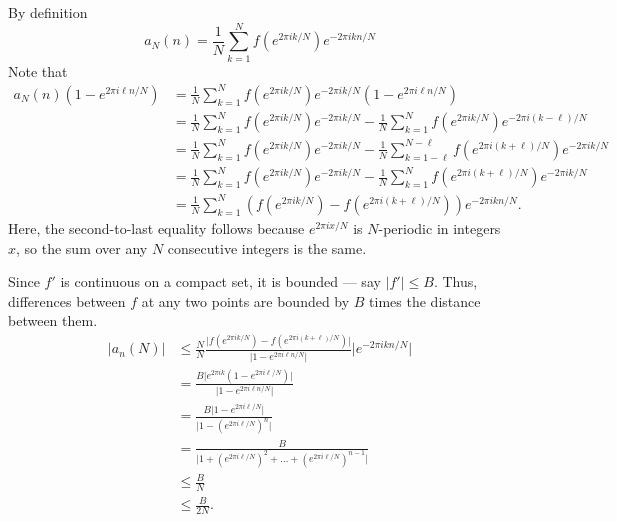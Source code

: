 \documentclass[12 pt, letterpaper]{hmcpset}
\begin{document}
\begin{solution}
	By definition
	\[
		a_{N}(n) = \frac{1}{N} \sum_{k = 1}^{N} f(e^{2 \pi i k / N}) e^{-2 \pi i k n / N}
	\]
	Note that
	\begin{align*}
		a_{N}(n) (1 - e^{2 \pi i \ell n / N}) & = \frac{1}{N} \sum_{k = 1}^{N} f(e^{2 \pi i k / N}) e^{- 2 \pi i k / N} (1 - e^{2 \pi i \ell n / N}) \\
						      & = \frac{1}{N} \sum_{k = 1}^{N} f(e^{2 \pi i k / N}) e^{-2 \pi i k / N} - \frac{1}{N} \sum_{k = 1}^{N} f(e^{2 \pi i k / N}) e^{- 2 \pi i (k - \ell) / N} \\
						      & = \frac{1}{N} \sum_{k = 1}^{N} f(e^{2 \pi i k / N}) e^{-2 \pi i k / N} - \frac{1}{N} \sum_{k = 1 - \ell}^{N - \ell} f(e^{2 \pi i (k + \ell) / N}) e^{- 2 \pi i k / N} \\
						      & = \frac{1}{N} \sum_{k = 1}^{N} f(e^{2 \pi i k / N}) e^{-2 \pi i k / N} - \frac{1}{N} \sum_{k = 1}^{N} f(e^{2 \pi i (k + \ell) / N}) e^{- 2 \pi i k / N} \\
						      & = \frac{1}{N} \sum_{k = 1}^{N} (f(e^{2 \pi i k / N}) - f(e^{2 \pi i (k + \ell) / N})) e^{- 2 \pi i k n / N}.
	\end{align*}
	Here, the second-to-last equality follows because $e^{2 \pi i x / N}$ is $N$-periodic in integers $x$, so the sum over any $N$ consecutive integers is the same.

	Since $f'$ is continuous on a compact set, it is bounded --- say $\lvert f' \rvert \le B$. Thus, differences between $f$ at any two points are bounded by $B$ times the distance between them.
	\begin{align*}
		\lvert a_{n}(N) \rvert & \le \frac{N}{N} \frac{\lvert f(e^{2 \pi i k / N}) - f(e^{2 \pi i (k + \ell) / N}) \rvert}{\lvert 1 - e^{2 \pi i \ell n / N} \rvert} \lvert e^{-2 \pi i k n / N} \rvert \\
				       & = \frac{B \lvert e^{2 \pi i k} (1 - e^{2 \pi i \ell / N}) \rvert}{\lvert 1 - e^{2 \pi i \ell n / N} \rvert} \\
				       & = \frac{B \lvert 1 - e^{2 \pi i \ell / N} \rvert}{\lvert 1 - (e^{2 \pi i \ell / N})^{n} \rvert} \\
				       & = \frac{B}{\lvert 1 + (e^{2 \pi i \ell / N})^{2} + \dots + (e^{2 \pi i \ell / N})^{n - 1} \rvert} \\
				       & \le \frac{B}{N} \\
				       & \le \frac{B}{2N}.
	\end{align*}
\end{solution}
\end{document}
